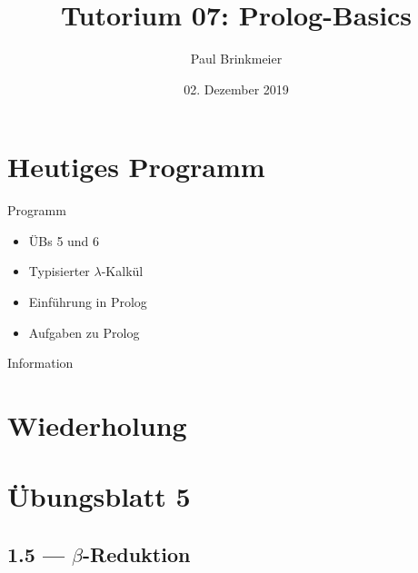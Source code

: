 \documentclass{beamer}
\title{Tutorium 07: Prolog-Basics}
\author{Paul Brinkmeier}
\institute{Tutorium Programmierparadigmen am KIT}
\date{02. Dezember 2019}
\begin{document}
\begin{frame}
	\titlepage
\end{frame}

\section{Heutiges Programm}

\begin{frame}{Programm}
	\begin{itemize}
		\item ÜBs 5 und 6
		\item Typisierter $\lambda$-Kalkül
		\item Einführung in Prolog
		\item Aufgaben zu Prolog
	\end{itemize}
\end{frame}

\begin{frame}{Information}
\end{frame}

\section{Wiederholung}

\newcommand{\aeq}{\stackrel{\alpha}{=}}
\newcommand{\naeq}{\stackrel{\alpha}{\neq}}
\newcommand{\eeq}{\stackrel{\eta}{=}}

\newcommand{\E}{\;}

\newcommand{\liin}[2]{#1\E{}#2}
\newcommand{\liiin}[3]{#1\E{}#2\E{}#3}
\newcommand{\livn}[4]{#1\E{}#2\E{}#3\E{}#4}
\newcommand{\lvn}[5]{#1\E{}#2\E{}#3\E{}#4\E{}#5}

\newcommand{\lii}[2]{(#1\E{}#2)}
\newcommand{\liii}[3]{(#1\E{}#2\E{}#3)}

\newcommand{\liir}[2]{\textcolor{red}{\underline{(}}#1\E{}#2\textcolor{red}{\underline{)}}}
\newcommand{\liiir}[3]{\textcolor{red}{\underline{(}}#1\E{}#2\E{}#3\textcolor{red}{\underline{)}}}

\newcommand{\subst}[3]{(#1)\left[#2\,\to\,#3\right]}

\section{Übungsblatt 5}

\subsection{1.5 --- $\beta$-Reduktion}
\end{document}
